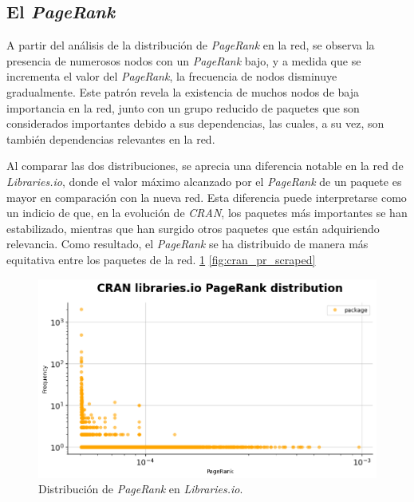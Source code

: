 \subsection{El \textit{PageRank}}

A partir del análisis de la distribución de \textit{PageRank} en la red, se observa la presencia
de numerosos nodos con un \textit{PageRank} bajo, y a medida que se incrementa el valor del
\textit{PageRank}, la frecuencia de nodos disminuye gradualmente. Este patrón revela la
existencia de muchos nodos de baja importancia en la red, junto con un grupo reducido de
paquetes que son considerados importantes debido a sus dependencias, las cuales, a su vez,
son también dependencias relevantes en la red.

Al comparar las dos distribuciones, se aprecia una diferencia notable en la red
de \textit{Libraries.io}, donde el valor máximo alcanzado por el \textit{PageRank} de
un paquete es mayor en comparación con la nueva red. Esta diferencia puede interpretarse
como un indicio de que, en la evolución de \textit{CRAN}, los paquetes más importantes
se han estabilizado, mientras que han surgido otros paquetes que están adquiriendo
relevancia. Como resultado, el \textit{PageRank} se ha distribuido de manera más equitativa
entre los paquetes de la red. \ref{fig:cran_pr_libio} \ref{fig:cran_pr_scraped}

\begin{figure}[ht!]
    \begin{center}
        \includegraphics[width=1\textwidth]{img/cran/pr.png}
        \caption{Distribución de \textit{PageRank} en \textit{Libraries.io}.}
        \label{fig:cran_pr_libio}
    \end{center}
\end{figure}

